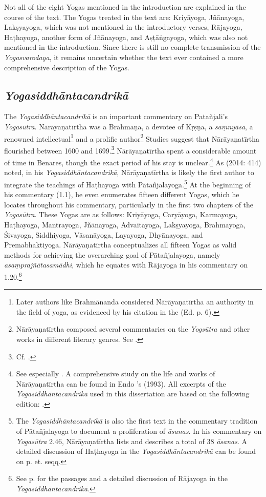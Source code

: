 Not all of the eight Yogas mentioned in the introduction are explained in the course of the text. The Yogas treated in the text are: Kriyāyoga, Jñānayoga, Lakṣyayoga, which was not mentioned in the introductory verses, Rājayoga, Haṭhayoga, another form of Jñānayoga, and Aṣṭāṅgayoga, which was also not mentioned in the introduction. Since there is still no complete transmission of the \emph{Yogasvarodaya}, it remains uncertain whether the text ever contained a more comprehensive description of the Yogas.

\subsection{\emph{Yogasiddhāntacandrikā}}

The \emph{Yogasiddhāntacandrikā} is an important commentary on Patañjali's \emph{Yogasūtra}. Nārāyaṇatīrtha was a Brāhmaṇa, a devotee of Kṛṣṇa, a \textit{saṃnyāsa}, a renowned intellectual\footnote{Later authors like Brahmānanda considered Nārāyaṇatīrtha an authority in the field of yoga, as evidenced by his citation in the  (Ed. p. 6).} and a prolific author\footnote{Nārāyaṇatīrtha composed several commentaries on the \emph{Yogsūtra} and other works in different literary genres. See \citeauthor[2004: 20-21]{penna2004}.} Studies suggest that Nārāyaṇatīrtha flourished between 1600 and 1699.\footnote{Cf. \citeauthor[1993: 56]{endo1993}.} Nārāyaṇatīrtha spent a considerable amount of time in Benares, though the exact period of his stay is unclear.\footnote{See especially \citeauthor[2004: 24]{penna2004}. A comprehensive study on the life and works of Nārāyaṇatīrtha can be found in Endo \citeauthor{endo1993}'s  (1993). All excerpts of the \emph{Yogasiddhāntacandrikā} used in this dissertation are based on the following edition: .}
As \citeauthor{birch2014} (2014: 414) noted, in his \emph{Yogasiddhāntacandrikā}, Nārāyaṇatīrtha is likely the first author to integrate the teachings of Haṭhayoga with Pātañjalayoga.\footnote{The \emph{Yogasiddhāntacandrikā} is also the first text in the commentary tradition of Pātañjalayoga to document a proliferation of \textit{āsanas}. In his commentary on \emph{Yogasūtra} 2.46, Nārāyaṇatīrtha lists and describes a total of 38 \textit{āsanas}. A detailed discussion of Haṭhayoga in the \emph{Yogasiddhāntacandrikā} can be found on p. \pageref{hathacandrika} et. seqq.} At the beginning of his commentary (1.1), he even enumerates fifteen different Yogas, which he locates throughout his commentary, particularly in the first two chapters of the \emph{Yogasūtra}. These Yogas are as follows: Kriyāyoga, Caryāyoga, Karmayoga, Haṭhayoga, Mantrayoga, Jñānayoga, Advaitayoga, Lakṣyayoga, Brahmayoga, Śivayoga, Siddhiyoga, Vāsanāyoga, Layayoga, Dhyānayoga, and Premabhaktiyoga. Nārāyaṇatīrtha conceptualizes all fifteen Yogas as valid methods for achieving the overarching goal of Pātañjalayoga, namely \textit{asaṃprajñātasamādhi}, which he equates with Rājayoga in his commentary on 1.20.\footnote{See p. \pageref{rajacandrika} for the passages and a detailed discussion of Rājayoga in the \emph{Yogasiddhāntacandrikā}.}

